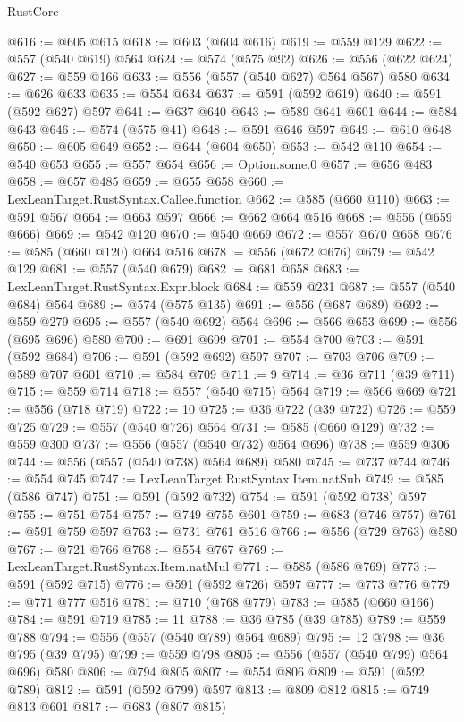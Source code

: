 \begin{lexlean}{RustCore}
\begin{coremodule}
@616 := @605 @615
@618 := @603 (@604 @616)
@619 := @559 @129
@622 := @557 (@540 @619) @564
@624 := @574 (@575 @92)
@626 := @556 (@622 @624)
@627 := @559 @166
@633 := @556 (@557 (@540 @627) @564 @567) @580
@634 := @626 @633
@635 := @554 @634
@637 := @591 (@592 @619)
@640 := @591 (@592 @627) @597
@641 := @637 @640
@643 := @589 @641 @601
@644 := @584 @643
@646 := @574 (@575 @41)
@648 := @591 @646 @597
@649 := @610 @648
@650 := @605 @649
@652 := @644 (@604 @650)
@653 := @542 @110
@654 := @540 @653
@655 := @557 @654
@656 := Option.some.{0}
@657 := @656 @483
@658 := @657 @485
@659 := @655 @658
@660 := LexLeanTarget.RustSyntax.Callee.function
@662 := @585 (@660 @110)
@663 := @591 @567
@664 := @663 @597
@666 := @662 @664 @516
@668 := @556 (@659 @666)
@669 := @542 @120
@670 := @540 @669
@672 := @557 @670 @658
@676 := @585 (@660 @120) @664 @516
@678 := @556 (@672 @676)
@679 := @542 @129
@681 := @557 (@540 @679)
@682 := @681 @658
@683 := LexLeanTarget.RustSyntax.Expr.block
@684 := @559 @231
@687 := @557 (@540 @684) @564
@689 := @574 (@575 @135)
@691 := @556 (@687 @689)
@692 := @559 @279
@695 := @557 (@540 @692) @564
@696 := @566 @653
@699 := @556 (@695 @696) @580
@700 := @691 @699
@701 := @554 @700
@703 := @591 (@592 @684)
@706 := @591 (@592 @692) @597
@707 := @703 @706
@709 := @589 @707 @601
@710 := @584 @709
@711 := 9
@714 := @36 @711 (@39 @711)
@715 := @559 @714
@718 := @557 (@540 @715) @564
@719 := @566 @669
@721 := @556 (@718 @719)
@722 := 10
@725 := @36 @722 (@39 @722)
@726 := @559 @725
@729 := @557 (@540 @726) @564
@731 := @585 (@660 @129)
@732 := @559 @300
@737 := @556 (@557 (@540 @732) @564 @696)
@738 := @559 @306
@744 := @556 (@557 (@540 @738) @564 @689) @580
@745 := @737 @744
@746 := @554 @745
@747 := LexLeanTarget.RustSyntax.Item.natSub
@749 := @585 (@586 @747)
@751 := @591 (@592 @732)
@754 := @591 (@592 @738) @597
@755 := @751 @754
@757 := @749 @755 @601
@759 := @683 (@746 @757)
@761 := @591 @759 @597
@763 := @731 @761 @516
@766 := @556 (@729 @763) @580
@767 := @721 @766
@768 := @554 @767
@769 := LexLeanTarget.RustSyntax.Item.natMul
@771 := @585 (@586 @769)
@773 := @591 (@592 @715)
@776 := @591 (@592 @726) @597
@777 := @773 @776
@779 := @771 @777 @516
@781 := @710 (@768 @779)
@783 := @585 (@660 @166)
@784 := @591 @719
@785 := 11
@788 := @36 @785 (@39 @785)
@789 := @559 @788
@794 := @556 (@557 (@540 @789) @564 @689)
@795 := 12
@798 := @36 @795 (@39 @795)
@799 := @559 @798
@805 := @556 (@557 (@540 @799) @564 @696) @580
@806 := @794 @805
@807 := @554 @806
@809 := @591 (@592 @789)
@812 := @591 (@592 @799) @597
@813 := @809 @812
@815 := @749 @813 @601
@817 := @683 (@807 @815)

\end{coremodule}
\end{lexlean}
